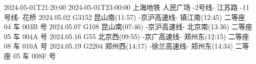 2024-05-01T21:20:00 2024-05-01T23:00:00 上海地铁 人民广场 -2号线- 江苏路 -11号线- 花桥
2024.05.02 G3152 昆山南(11:57) -京沪高速线- 镇江南(12:45) 二等座 04 车 003B 号
2024.05.07 G108  昆山南(07:46) -京沪高速线- 北京南(13:36) 二等座 05 车 004A 号
2024.05.16 G55   北京西(09:55) -京广高速线- 郑州东(12:15) 二等座 08 车 010A 号
2024.05.19 G2204 郑州西(14:17) -徐兰高速线- 郑州东(14:34) 二等座 05 车 008F 号





